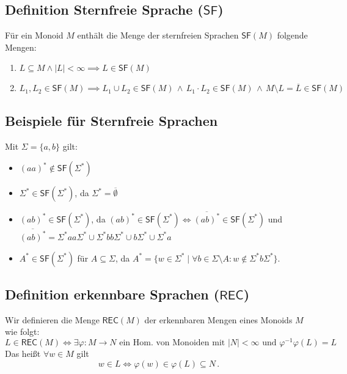\documentclass[12pt, german]{article}
\newcommand{\sigstern}{\Sigma^\ast}
\newcommand{\inv}{^{-1}}
\newcommand{\rec}{\mathsf{REC}}
\newcommand{\starfree}{\mathsf{SF}}
\begin{document}
	
	\subsection{Definition Sternfreie Sprache ($\starfree$)}
	Für ein Monoid $M$ enthält die Menge der sternfreien Sprachen $\starfree(M)$ folgende Mengen:
	\begin{enumerate}[label=\arabic*)]
		\item $L \subseteq M \wedge |L| < \infty \implies L \in \starfree(M)$
		\item $L_1, L_2 \in \starfree(M) \implies L_1 \cup L_2 \in \starfree(M) \, \wedge \, L_1 \cdot L_2 \in \starfree(M) \, \wedge \, M \setminus L = \overline{L} \in \starfree(M)$\\ 
	\end{enumerate}
	
	\subsection{Beispiele für Sternfreie Sprachen}
	Mit $\Sigma = \{a,b\}$ gilt:
	\begin{itemize}
		\item $(aa)^\ast \not\in \starfree(\sigstern)$
				\item $\sigstern \in \starfree(\sigstern)$, da $\sigstern = \overline{\emptyset}$
		\item $(ab)^\ast \in \starfree(\sigstern)$, da $(ab)^\ast \in \starfree(\sigstern) \iff \overline{(ab)^\ast}\in \starfree(\sigstern)$ und $\overline{(ab)^\ast} = \sigstern aa \sigstern \cup \sigstern bb \sigstern \cup b\sigstern \cup \sigstern a$
		\item $A^\ast \in \starfree(\sigstern)$ für $A\subseteq \Sigma$, da $A^\ast = \{ w \in \sigstern \mid \forall b \in \Sigma \setminus A : w \notin \sigstern b\sigstern\}$.
	\end{itemize}
	
	
	
	\subsection{Definition erkennbare Sprachen ($\rec$)}
	\label{sec:rec}
	Wir definieren die Menge $\rec(M)$ der erkennbaren Mengen eines Monoids $M$ wie folgt:  $$L \in \rec(M) \iff \exists \varphi : M \to N \text{ ein Hom. von Monoiden mit } |N| < \infty \text{ und } \varphi\inv\varphi(L) = L$$
	Das hei\ss t $\forall w \in M$ gilt $$w\in L \iff \varphi(w) \in \varphi(L) \subseteq N\, .$$
	
\end{document}
